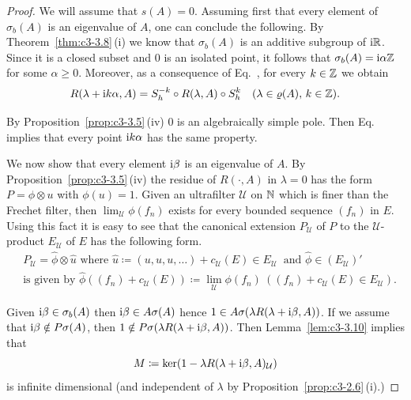 \begin{proof}
	We will assume that $s(A) = 0$.
	Assuming first that every element of\/ $\sigma_{b}(A)$ is an eigenvalue of\/ $A$, one can conclude the following.
	By Theorem~\ref{thm:c3-3.8}\,(i) we know that $\sigma_{b}(A)$ is an additive subgroup of\/ $\mathrm{i}\mathbb{R} $.
	Since it is a closed subset and $0$ is an isolated point, it follows that $\sigma_{b}(A) = \mathrm{i}\alpha\mathbb{Z}$ for some $\alpha \geq 0$.
	Moreover, as a consequence of Eq.~, for every $k \in \mathbb{Z}$ we obtain
	\begin{equation}\label{eq:c3-3.15}
		R(\lambda+\im k\alpha,A) = S_{h}^{-k}\circ R(\lambda,A)\circ S_{h}^{k} \quad (\lambda \in \rho(A),\, k \in \Z).
	\end{equation}
	
	By Proposition~\ref{prop:c3-3.5}\,(iv) $0$ is an algebraically simple pole.
	Then Eq.~ implies that every point $\mathrm{i} k\alpha$ has the same property.
	
	We now show that every element $\mathrm{i}\beta$ is an eigenvalue of\/ $A$.
	By Proposition~\ref{prop:c3-3.5}\,(iv) the residue of\/ $R(\cdot,A)$ in $\lambda = 0$ has the form $P = \phi\otimes u$ with $\phi(u) = 1$.
	Given an ultrafilter $\mathcal{U}$ on $\mathbb{N}$ which is finer than the Frechet filter, then $\lim_{\mathcal{U}}\phi(f_{n})$ exists for every bounded sequence $(f_{n})$ in $E$.
	Using this fact it is easy to see that the canonical extension $P_{\mathcal{U}}$ of\/ $P$ to the $\mathcal{U}$-product $E_{\mathcal{U}}$ of\/ $E$ has the following form.
\begin{equation}\label{eq:c3-3.16}
\begin{split}
		&P_{\mathcal{U}} = \hat{\phi}\otimes\hat{u} \text{ where } \hat{u} \coloneq (u,u,u,\ldots)+c_{\mathcal{U}}(E) \in E_{\mathcal{U}} \ \text{ and } \hat{\phi} \in (E_{\mathcal{U}})'
		\\
		&\text{is given by } \hat{\phi}((f_{n})+c_{\mathcal{U}}(E)) \coloneq \lim_{\mathcal{U}}\phi(f_{n}) \ ((f_{n})+c_{\mathcal{U}}(E) \in E_{\mathcal{U}}) .
		\end{split}
	\end{equation}
	
	Given $\mathrm{i}\beta \in \sigma_{b}(A)$ then $\mathrm{i}\beta \in A\sigma(A)$ hence $1 \in A\sigma(\lambda R(\lambda+\mathrm{i}\beta,A))$.
	If we assume that  $\mathrm{i}\beta \notin P\sigma(A)$, then $1 \notin P\sigma(\lambda R(\lambda+\mathrm{i}\beta,A))$.
	Then Lemma~\ref{lem:c3-3.10} implies that 
\[
	M \coloneq \ker(1 - \lambda R(\lambda+\mathrm{i}\beta,A)_{\mathcal{U}})
\]
%
is infinite dimensional (and independent of\/ $\lambda$ by Proposition~\ref{prop:c3-2.6}\,(i).)


\end{proof}
